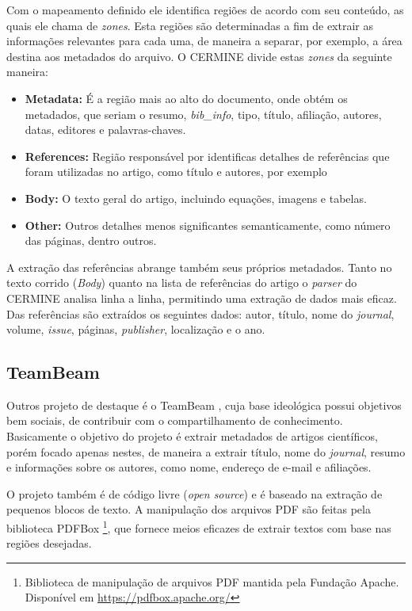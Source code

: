 Com o mapeamento definido ele identifica regiões de acordo com seu conteúdo, as quais ele chama de \textit{zones}. Esta regiões são determinadas a fim de extrair as informações relevantes para cada uma, de maneira a separar, por exemplo, a área destina aos metadados do arquivo. O CERMINE divide estas \textit{zones} da seguinte maneira:

\begin{itemize}
\item \textbf{Metadata:} É a região mais ao alto do documento, onde obtém os metadados, que seriam o resumo, \textit{bib\_info}, tipo, título, afiliação, autores, datas, editores e palavras-chaves.
\item \textbf{References:} Região responsável por identificas detalhes de referências que foram utilizadas no artigo, como título e autores, por exemplo
\item \textbf{Body:} O texto geral do artigo, incluindo equações, imagens e tabelas.
\item \textbf{Other:} Outros detalhes menos significantes semanticamente, como número das páginas, dentro outros.
\end{itemize}

A extração das referências abrange também seus próprios metadados. Tanto no texto corrido (\textit{Body}) quanto na lista de referências do artigo o \textit{parser} do CERMINE analisa linha a linha, permitindo uma extração de dados mais eficaz. Das referências são extraídos os seguintes dados: autor, título, nome do \textit{journal}, volume, \textit{issue}, páginas, \textit{publisher}, localização e o ano.

\subsection{TeamBeam}

Outros projeto de destaque é o TeamBeam \cite{teambeam}, cuja base ideológica possui objetivos bem sociais, de contribuir com o compartilhamento de conhecimento. Basicamente o objetivo do projeto é extrair metadados de artigos científicos, porém focado apenas nestes, de maneira a extrair título, nome do \textit{journal}, resumo e informações sobre os autores, como nome, endereço de e-mail e afiliações.

O projeto também é de código livre (\textit{open source}) e é baseado na extração de pequenos blocos de texto. A manipulação dos arquivos PDF são feitas pela biblioteca PDFBox \footnote{Biblioteca de manipulação de arquivos PDF mantida pela Fundação Apache. Disponível em \url{https://pdfbox.apache.org/}}, que fornece meios eficazes de extrair textos com base nas regiões desejadas.

